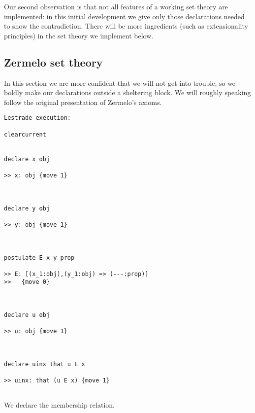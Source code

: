 \documentclass{article}
\begin{document}
Our second observation is that not all features of a working set theory are implemented:  in this initial development we give only those declarations needed to show the contradiction.  There will be more ingredients (such as extensionality principles) in the set theory we implement below.

\subsection{Zermelo set theory}

In this section we are more confident that we will not get into trouble, so we boldly make our declarations outside a sheltering block.  We will roughly speaking follow the original presentation
of Zermelo's axioms.

\begin{verbatim}Lestrade execution:

clearcurrent


declare x obj

>> x: obj {move 1}



declare y obj

>> y: obj {move 1}



postulate E x y prop

>> E: [(x_1:obj),(y_1:obj) => (---:prop)]
>>   {move 0}



declare u obj

>> u: obj {move 1}



declare uinx that u E x

>> uinx: that (u E x) {move 1}


\end{verbatim}

We declare the membership relation.
\end{document}
